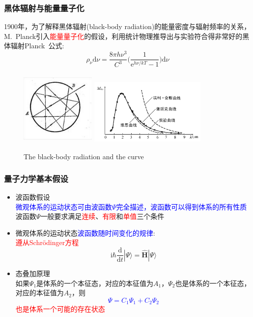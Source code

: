\documentclass[cjk,slidestop,compress,mathserif,blue]{beamer}
\begin{document}
\frame
{
	\frametitle{黑体辐射与能量量子化}
	\textrm{1900}年，为了解释黑体辐射\textrm{(black-body radiation)}的能量密度与辐射频率的关系，\textrm{M.~Planck}引入\textcolor{red}{能量量子化}的假设，利用统计物理推导出与实验符合得非常好的黑体辐射\textrm{Planck~}公式:~
	\begin{displaymath}
		\rho_{\nu}\mathrm{d}{\nu}=\dfrac{8{\pi}h{\nu}^3}{C^3}\bigg(\dfrac1{\mathrm{e}^{h\nu/kT}-1}\bigg)\mathrm{d}\nu
	\end{displaymath}
\begin{figure}[h!]
\centering
\vspace{-10.5pt}
\includegraphics[height=1.45in,width=1.45in,viewport=0 0 136 136,clip]{Figures/Black_box.jpg}
\hskip 1pt
\includegraphics[height=1.32in,width=2.25in,viewport=0 0 390 215,clip]{Figures/Black_box_curve.png}
\caption{\textrm{The black-body radiation and the curve}}
\label{Black_box}
\end{figure}
}

\frame
{
	\frametitle{量子力学基本假设}
	\begin{itemize}
		\item 波函数假设\\
			\textcolor{blue}{微观体系的运动状态可由波函数$\Psi$完全描述，波函数可以得到体系的所有性质}\\
			波函数$\Psi$一般要求满足\textcolor{red}{连续}、\textcolor{red}{有限}和\textcolor{red}{单值}三个条件
		\item 微观体系的运动状态\textcolor{blue}{波函数随时间变化的规律}:\\\textcolor{red}{遵从\textrm{Schr\"odinger}方程}
			$$\mathrm{i}\hbar\dfrac{\mathrm{d}}{\mathrm{d}t}|\Psi\rangle=\hat{\mathbf H}|\Psi\rangle$$
		\item 态叠加原理\\
			如果$\Psi_1$是体系的一个本征态，对应的本征值为$A_1$，$\Psi_2$也是体系的一个本征态，对应的本征值为$A_2$，则\textcolor{blue}{$$\Psi=C_1\Psi_1+C_2\Psi_2$$}\textcolor{red}{也是体系一个可能的存在状态}
	\end{itemize}
}
\end{document}
